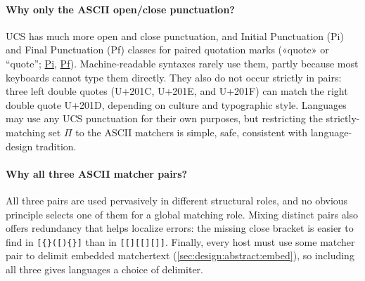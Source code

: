 \paragraph{Why only the ASCII open/close punctuation?}
UCS has much more open and close punctuation,
and Initial Punctuation (Pi)
and Final Punctuation (Pf)
classes for paired quotation marks (\eg «quote» or “quote”;
\href{https://www.compart.com/en/unicode/category/Pi}{Pi},
\href{https://www.compart.com/en/unicode/category/Pf}{Pf}).
Machine-readable syntaxes rarely use them,
partly because most keyboards cannot type them directly.
They also do not occur strictly in pairs:
three left double quotes (U+201C, U+201E, and U+201F)
can match the right double quote U+201D,
depending on culture and typographic style.
Languages may use any UCS punctuation for their own purposes,
but restricting the strictly-matching set $\Pi$
to the ASCII matchers is simple, safe,
consistent with language-design tradition.

\paragraph{Why all three ASCII matcher pairs?}
All three pairs are used pervasively in different structural roles,
and no obvious principle selects one of them for a global matching role.
Mixing distinct pairs also offers redundancy that helps localize errors:
the missing close bracket is easier to find in \verb|[{}([){}]|
than in \verb|[[][[][]]|.
Finally, every host must use some matcher pair
to delimit embedded matchertext (\cref{sec:design:abstract:embed}),
so including all three gives languages a choice of delimiter.
